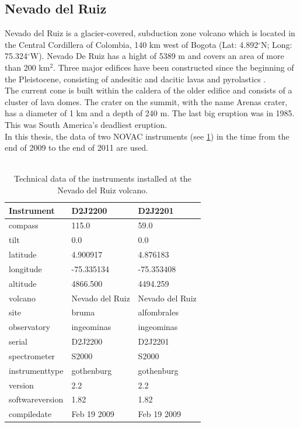 \subsection*{Nevado del Ruiz}
Nevado del Ruiz is a glacier-covered, subduction zone volcano which is located in the Central Cordillera of Colombia, 140 km west of Bogota
(Lat: 4.892$^{\circ}$N; Long: 75.324$^{\circ}$W). Nevado De Ruiz has a hight of 5389 m and covers an area of more than 200 km$^2$.
Three major edifices have been constructed since the beginning of the Pleistocene, consisting of andesitic and dacitic lavas and pyrolastics \citep{GlobalVolcanismProgram}. \\
The current cone is built within the caldera of the older edifice and consists of a cluster of lava domes. The crater on the summit, with the name Arenas crater, has a diameter of 1 km and a depth of 240 m. 
The last big eruption was in 1985. This was South America's deadliest eruption.\\
In this thesis, the data of two NOVAC instruments (see \cref{tab:NVDRInstruments}) in the time from the end of 2009 to the end of 2011 are used. \\
\\
\begin{table}
	\centering
	\begin{tabular}{|p{4cm}|p{3cm}|p{3cm}|}
		Instrument    &D2J2200&D2J2201\\
		\toprule
		compass&115.0        &59.0        \\
		tilt&0.0        &0.0        \\
		latitude&4.900917        &4.876183        \\
		longitude&-75.335134        &-75.353408        \\
		altitude&4866.500        &4494.259        \\
		volcano&Nevado del Ruiz        &Nevado del Ruiz        \\
		site&bruma    &alfombrales\\
		observatory&ingeominas        &ingeominas        \\
		serial&D2J2200        &D2J2201        \\
		spectrometer&S2000        &S2000        \\    
		instrumenttype &gothenburg        &gothenburg        \\
		version&2.2        &2.2        \\
		softwareversion &1.82        &1.82        \\
		compiledate &Feb 19 2009        &Feb 19 2009        \\
		\bottomrule
	\end{tabular}
	\caption{Technical data of the instruments installed at the Nevado del Ruiz volcano.}
	\label{tab:NVDRInstruments}
\end{table}